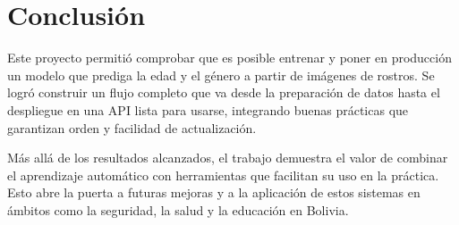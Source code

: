 \section{Conclusión}

Este proyecto permitió comprobar que es posible entrenar y poner en producción un modelo que prediga la edad y
el género a partir de imágenes de rostros. Se logró construir un flujo completo que va desde la preparación de
datos hasta el despliegue en una API lista para usarse, integrando buenas prácticas que garantizan orden y
facilidad de actualización.\newline

Más allá de los resultados alcanzados, el trabajo demuestra el valor de combinar el aprendizaje automático con
herramientas que facilitan su uso en la práctica. Esto abre la puerta a futuras mejoras y a la aplicación de
estos sistemas en ámbitos como la seguridad, la salud y la educación en Bolivia.\newline